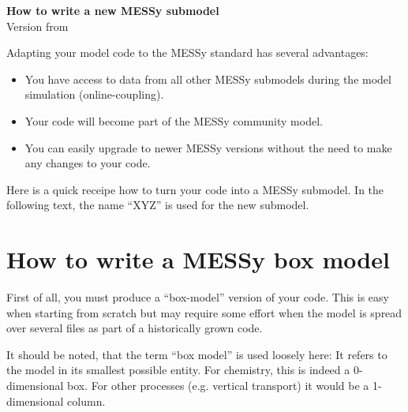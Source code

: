 \documentclass[a4paper,12pt,twoside]{article}
\def\nosep{\setlength\parsep{0mm}\setlength\topsep{0mm}\setlength\itemsep{0mm}}
\def\mytitle{How to write a new MESSy submodel}
\begin{document}
\begin{center}
  {\LARGE\bf\mytitle}\\[3mm]
  Version from \myfiledate
\end{center}

Adapting your model code to the MESSy standard has several advantages:

\begin{itemize}\nosep
\item You have access to data from all other MESSy submodels during the
  model simulation (online-coupling).
\item Your code will become part of the MESSy community model.
\item You can easily upgrade to newer MESSy versions without the need to
  make any changes to your code.
\end{itemize}

Here is a quick receipe how to turn your code into a MESSy submodel. In
the following text, the name ``XYZ'' is used for the new submodel.

\section{How to write a MESSy box model}

First of all, you must produce a ``box-model'' version of your code.
This is easy when starting from scratch but may require some effort when
the model is spread over several files as part of a historically grown
code.

It should be noted, that the term ``box model'' is used loosely here: It
refers to the model in its smallest possible entity. For chemistry, this
is indeed a 0-dimensional box. For other processes (e.g. vertical
transport) it would be a 1-dimensional column.
\end{document}
